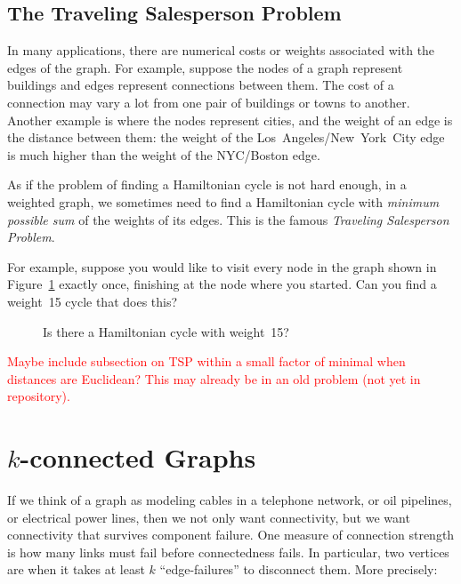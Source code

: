 \subsection{The Traveling Salesperson Problem}

In many applications, there are numerical costs or weights associated
with the edges of the graph.  For example, suppose the nodes of a
graph represent buildings and edges represent connections between
them.  The cost of a connection may vary a lot from one pair of
buildings or towns to another.  Another example is where the nodes
represent cities, and the weight of an edge is the distance between
them: the weight of the Los~Angeles/New~York~City edge is much higher
than the weight of the NYC/Boston edge.

As if the problem of finding a Hamiltonian cycle is not hard enough,
in a weighted graph, we sometimes need to find a Hamiltonian cycle
with \emph{minimum possible sum} of the weights of its edges.  This is
the famous \emph{Traveling Salesperson Problem}.

For example, suppose you would like to visit every node in the graph
shown in Figure~\ref{fig:5AL} exactly once, finishing at the node where
you started.  Can you find a weight~15 cycle that does this?

\begin{figure}
\caption{Is there a Hamiltonian cycle with weight~15?}
\label{fig:5AL}
\end{figure}

\iffalse
Needless to say, if you can figure out a fast procedure that finds the
minimum cycle for the traveling salesperson, let us know so that we
can win a million dollars.
\fi

\begin{editingnotes}
\textcolor{red}{Maybe include subsection on TSP within a small factor
  of minimal when distances are Euclidean?  This may already be in an
  old problem (not yet in repository).}
\end{editingnotes}

\section{$k$-connected Graphs}

If we think of a graph as modeling cables in a telephone network, or
oil pipelines, or electrical power lines, then we not only want
connectivity, but we want connectivity that survives component
failure.  One measure of connection strength is how many links must
fail before connectedness fails.  In particular, two vertices are
 when it takes at least $k$ ``edge-failures''
to disconnect them.  More precisely:

